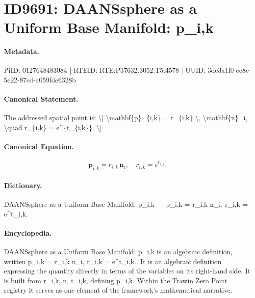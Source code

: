 \section*{ID9691: DAANSsphere as a Uniform Base Manifold: p\_i,k}
\paragraph{Metadata.}
PiID: 0127648483084 | RTEID: RTE:P37632.3052:T5.4578 | UUID: 3de3a1f0-ec8e-5e22-87ed-a059fdc6328b

\paragraph{Canonical Statement.}
The addressed spatial point is: \textbackslash{}[ \textbackslash{}mathbf\{p\}\_\{i,k\} = r\_\{i,k\} \textbackslash{}, \textbackslash{}mathbf\{n\}\_i, \textbackslash{}quad r\_\{i,k\} = e\textasciicircum{}\{t\_\{i,k\}\}. \textbackslash{}]

\paragraph{Canonical Equation.}
\[
\mathbf{p}_{i,k} = r_{i,k} \, \mathbf{n}_i, \quad r_{i,k} = e^{t_{i,k}}.
\]

\paragraph{Dictionary.}
DAANSsphere as a Uniform Base Manifold: p\_i,k — p\_i,k = r\_i,k n\_i, r\_i,k = e\textasciicircum{}t\_i,k.

\paragraph{Encyclopedia.}
DAANSsphere as a Uniform Base Manifold: p\_i,k is an algebraic definition, written p\_i,k = r\_i,k n\_i, r\_i,k = e\textasciicircum{}t\_i,k.. It is an algebraic definition expressing the quantity directly in terms of the variables on its right-hand side. It is built from r\_i,k, n, t\_i,k, defining p\_i,k. Within the Trawin Zero Point registry it serves as one element of the framework's mathematical narrative.
